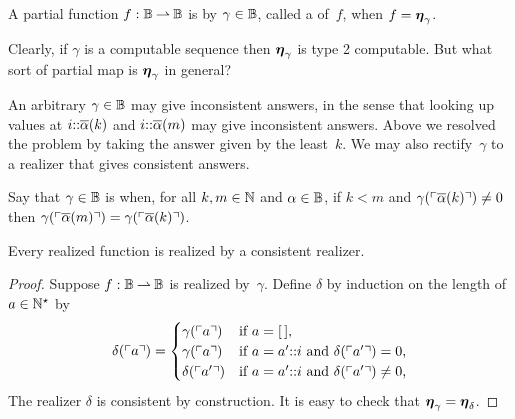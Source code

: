 \begin{definition}
  \label{def:type-2-realized}%
  A partial function $f : \mathbb{B} \mathbin{\rightharpoonup} \mathbb{B}$ is  by $\gamma \in \mathbb{B}$, called a  of~$f$, when $f = \text{\boldmath{$\eta$}}_\gamma$.
\end{definition}

Clearly, if $\gamma$ is a computable sequence then $\text{\boldmath{$\eta$}}_\gamma$ is type 2 computable.
But what sort of partial map is $\text{\boldmath{$\eta$}}_\gamma$ in general?

An arbitrary $\gamma \in \mathbb{B}$ may give inconsistent answers, in the sense that looking up values at $i {:}{:} \overline{\alpha}(k)$ and $i {:}{:} \overline{\alpha}(m)$ may give inconsistent answers. Above we resolved the problem by taking the answer given by the least~$k$. We may also rectify~$\gamma$ to a realizer that gives consistent answers.

Say that $\gamma \in \mathbb{B}$ is  when, for all $k, m \in \mathbb{N}$ and
$\alpha \in \mathbb{B}$, if $k < m$ and $\gamma(\ulcorner \overline{\alpha}(k) \urcorner) \neq 0$ then
$\gamma(\ulcorner \overline{\alpha}(m) \urcorner) = \gamma(\ulcorner \overline{\alpha}(k) \urcorner)$.

\begin{lemma}
  \label{lemma:normalized-BB}%
  Every realized function is realized by a consistent realizer.
\end{lemma}

\begin{proof}
  Suppose $f : \mathbb{B} \mathbin{\rightharpoonup} \mathbb{B}$ is realized by~$\gamma$. Define
  $\delta$ by induction on the length of $a \in \mathbb{N}^{\star}$ by
  \begin{equation*}
    \delta(\ulcorner a \urcorner) =
    \begin{cases}
      \gamma(\ulcorner a \urcorner) & \text{if $a = [\,]$,}\\
      \gamma(\ulcorner a \urcorner) & \text{if $a = a' {:}{:} i$ and
        $\delta(\ulcorner a' \urcorner) = 0$,}\\
      \delta(\ulcorner a' \urcorner) & \text{if $a = a' {:}{:} i$ and
        $\delta(\ulcorner a' \urcorner) \neq 0$,}
    \end{cases}
  \end{equation*}
  The realizer $\delta$ is consistent by construction. It is easy to check that $\text{\boldmath{$\eta$}}_\gamma = \text{\boldmath{$\eta$}}_\delta$.
\end{proof}


